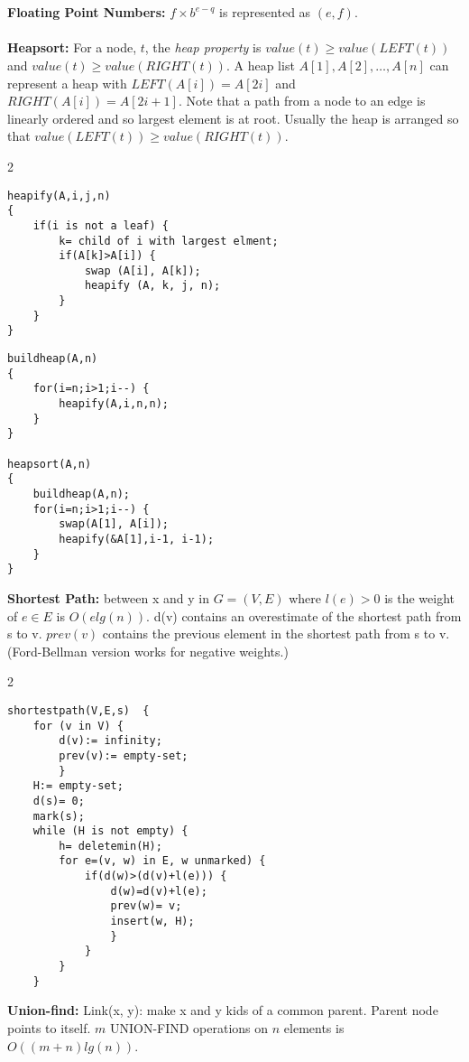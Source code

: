 \\
\\
{\bf Floating Point Numbers:} $f \times b^{e-q}$ is represented as $(e, f)$.
\\
\\
{\bf Heapsort:} For a node, $t$, the \emph{heap property} is
$value(t) \geq value(LEFT(t))$ and $value(t) \geq value(RIGHT(t))$.  
A heap list $A[1], A[2] , \ldots, A[n]$ can represent a heap with 
$LEFT(A[i])= A[2i]$ and $RIGHT(A[i])= A[2i+1]$.  Note that a path 
from a node to an edge is linearly ordered and
so largest element is at root.  Usually the
heap is arranged so that $value(LEFT(t)) \geq value(RIGHT(t))$.
\begin{multicols} {2} {
\begin{verbatim}
heapify(A,i,j,n) 
{
    if(i is not a leaf) {
        k= child of i with largest elment;
        if(A[k]>A[i]) {
            swap (A[i], A[k]);
            heapify (A, k, j, n);
        }
    }
}
\end{verbatim}

\begin{verbatim}
buildheap(A,n) 
{
    for(i=n;i>1;i--) {
        heapify(A,i,n,n);
    }
}

heapsort(A,n) 
{
    buildheap(A,n);
    for(i=n;i>1;i--) {
        swap(A[1], A[i]); 
        heapify(&A[1],i-1, i-1);
    }
}
\end{verbatim}
}
\end{multicols}

{\bf Shortest Path:} between x and y in $G=(V, E)$ where
$l(e)>0$ is the weight of $e \in E$ is $O(e lg(n))$. d(v) contains an overestimate
of the shortest path from s to v.
$prev(v)$ contains the previous element in the
shortest path from s to v.  (Ford-Bellman version works for negative weights.)
\begin{multicols} {2} {
\begin{verbatim}
shortestpath(V,E,s)  {
    for (v in V) {
        d(v):= infinity;
        prev(v):= empty-set;
        }
    H:= empty-set; 
    d(s)= 0; 
    mark(s);
    while (H is not empty) {
        h= deletemin(H);
        for e=(v, w) in E, w unmarked) {
            if(d(w)>(d(v)+l(e))) {
                d(w)=d(v)+l(e);
                prev(w)= v;
                insert(w, H);
                }
            }
        }
    }
\end{verbatim}
}
\end{multicols}

{\bf Union-find:}  Link(x, y): make x and y kids of a common parent.  Parent node
points to itself.  $m$ UNION-FIND operations on $n$ elements is $O((m+n) lg(n))$.

